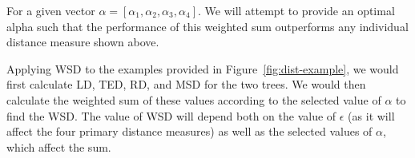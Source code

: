 For a given vector $\alpha = [\alpha_1, \alpha_2, \alpha_3, \alpha_4]$. We will attempt to provide an optimal alpha such that the performance of this weighted sum outperforms any individual distance measure shown above.

Applying WSD to the examples provided in Figure~\ref{fig:dist-example}, we would first calculate LD, TED, RD, and MSD for the two trees. We would then calculate the weighted sum of these values according to the selected value of $\alpha$ to find the WSD. The value of WSD will depend both on the value of $\epsilon$ (as it will affect the four primary distance measures) as well as the selected values of $\alpha$, which affect the sum.




